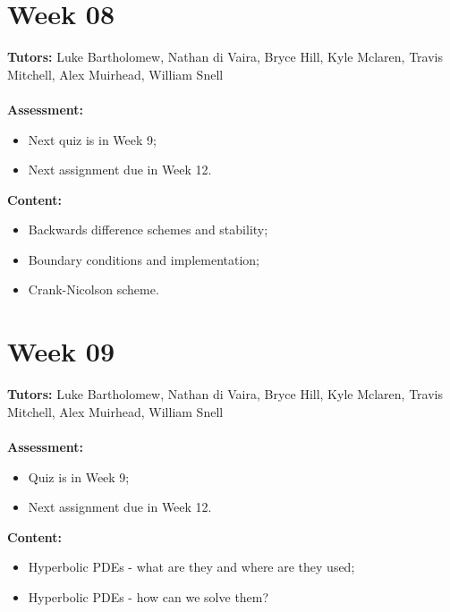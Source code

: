 \documentclass[11pt,a4paper]{report}
\begin{document}
	
	\begingroup
	\makeatletter
	\let\clearpage\relax
	\vspace*{\fill}%
	\vspace*{\dimexpr-50\p@-\baselineskip}
	\chapter*{Week 08}
	\textbf{Tutors:} Luke Bartholomew, Nathan di Vaira, Bryce Hill, Kyle Mclaren, Travis Mitchell, Alex Muirhead, William Snell \\\\
	\textbf{Assessment:} 
	\begin{itemize}
		\item Next quiz is in Week 9;
		\item Next assignment due in Week 12. 
	\end{itemize}	
	\textbf{Content:}
	\begin{itemize}
		\item Backwards difference schemes and stability;
		\item Boundary conditions and implementation;
		\item Crank-Nicolson scheme.
	\end{itemize}
	\vspace*{\fill}
	\endgroup
	
	
	
	\begingroup
	\makeatletter
	\let\clearpage\relax
	\vspace*{\fill}%
	\vspace*{\dimexpr-50\p@-\baselineskip}
	\chapter*{Week 09}
	\textbf{Tutors:} Luke Bartholomew, Nathan di Vaira, Bryce Hill, Kyle Mclaren, Travis Mitchell, Alex Muirhead, William Snell \\\\
	\textbf{Assessment:} 
	\begin{itemize}
		\item Quiz is in Week 9;
		\item Next assignment due in Week 12. 
	\end{itemize}	
	\textbf{Content:}
	\begin{itemize}
		\item Hyperbolic PDEs - what are they and where are they used;
		\item Hyperbolic PDEs - how can we solve them?
	\end{itemize}
	\vspace*{\fill}
	\endgroup
	
\end{document}
